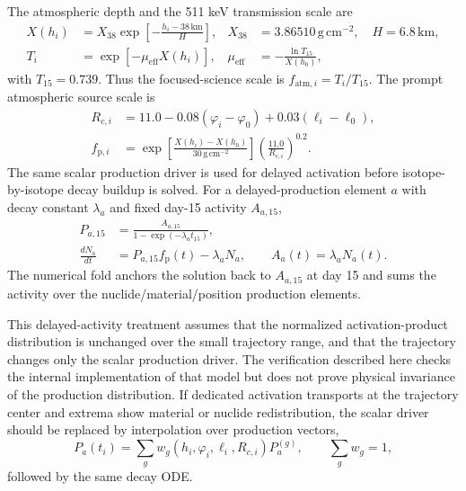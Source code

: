 \documentclass[preprint,12pt]{elsarticle}
\begin{document}
The atmospheric depth and the 511 keV transmission scale are
\begin{align}
  X(h_i) &= X_{38}\exp\!\left[-\frac{h_i-38\,\mathrm{km}}{H}\right],
       & X_{38}&=3.86510\,\mathrm{g\,cm^{-2}},\quad H=6.8\,\mathrm{km},\\
  T_i &= \exp[-\mu_{\mathrm{eff}} X(h_i)],
       & \mu_{\mathrm{eff}}&=-\frac{\ln T_{15}}{X(h_0)},
\end{align}
with $T_{15}=0.739$. Thus the focused-science scale is
$f_{\mathrm{atm},i}=T_i/T_{15}$. The prompt atmospheric source scale is
\begin{align}
  R_{c,i} &= 11.0 -0.08(\varphi_i-\varphi_0)+0.03(\ell_i-\ell_0),\\
  f_{\mathrm{p},i} &=
  \exp\!\left[\frac{X(h_i)-X(h_0)}{30\,\mathrm{g\,cm^{-2}}}\right]
  \left(\frac{11.0}{R_{c,i}}\right)^{0.2}.
\end{align}
The same scalar production driver is used for delayed activation before
isotope-by-isotope decay buildup is solved. For a delayed-production element
$a$ with decay constant $\lambda_a$ and fixed day-15 activity $A_{a,15}$,
\begin{align}
  P_{a,15} &= \frac{A_{a,15}}{1-\exp(-\lambda_a t_{15})},\\
  \frac{dN_a}{dt} &= P_{a,15}f_{\mathrm{p}}(t)-\lambda_a N_a,\qquad
  A_a(t)=\lambda_a N_a(t).
\end{align}
The numerical fold anchors the solution back to $A_{a,15}$ at day 15 and sums
the activity over the nuclide/material/position production elements.

This delayed-activity treatment assumes that the normalized activation-product
distribution is unchanged over the small trajectory range, and that the
trajectory changes only the scalar production driver. The verification
described here checks the internal implementation of that model but does not
prove physical invariance of the production distribution. If dedicated activation transports at the trajectory center and
extrema show material or nuclide redistribution, the scalar driver should be
replaced by interpolation over production vectors,
\begin{equation}
  P_a(t_i)=\sum_g w_g(h_i,\varphi_i,\ell_i,R_{c,i})P_a^{(g)},\qquad
  \sum_g w_g=1,
\end{equation}
followed by the same decay ODE.
\end{document}
